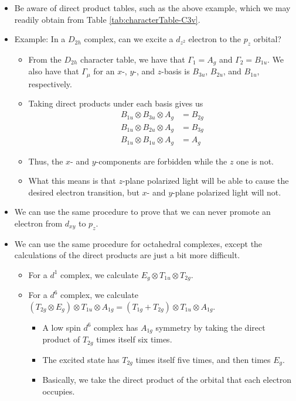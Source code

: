 \documentclass[../notes.tex]{subfiles}
\begin{document}
\begin{itemize}
    \item Be aware of direct product tables, such as the above example, which we may readily obtain from Table \ref{tab:characterTable-C3v}.
    \item Example: In a $D_{2h}$ complex, can we excite a $d_{z^2}$ electron to the $p_z$ orbital?
    \begin{itemize}
        \item From the $D_{2h}$ character table, we have that $\Gamma_1=A_g$ and $\Gamma_2=B_{1u}$. We also have that $\Gamma_\mu$ for an $x$-, $y$-, and $z$-basis is $B_{3u}$, $B_{2u}$, and $B_{1u}$, respectively.
        \item Taking direct products under each basis gives us
        \begin{align*}
            B_{1u}\otimes B_{3u}\otimes A_g &= B_{2g}\tag{$x$-basis}\\
            B_{1u}\otimes B_{2u}\otimes A_g &= B_{3g}\tag{$y$-basis}\\
            B_{1u}\otimes B_{1u}\otimes A_g &= A_g\tag{$z$-basis}
        \end{align*}
        \item Thus, the $x$- and $y$-components are forbidden while the $z$ one is not.
        \item What this means is that $z$-plane polarized light will be able to cause the desired electron transition, but $x$- and $y$-plane polarized light will not.
    \end{itemize}
    \item We can use the same procedure to prove that we can never promote an electron from $d_{xy}$ to $p_z$.
    \item We can use the same procedure for octahedral complexes, except the calculations of the direct products are just a bit more difficult.
    \begin{itemize}
        \item For a $d^1$ complex, we calculate $E_g\otimes T_{1u}\otimes T_{2g}$.
        \item For a $d^6$ complex, we calculate $(T_{2g}\otimes E_g)\otimes T_{1u}\otimes A_{1g}=(T_{1g}+T_{2g})\otimes T_{1u}\otimes A_{1g}$.
        \begin{itemize}
            \item A low spin $d^6$ complex has $A_{1g}$ symmetry by taking the direct product of $T_{2g}$ times itself six times.
            \item The excited state has $T_{2g}$ times itself five times, and then times $E_g$.
            \item Basically, we take the direct product of the orbital that each electron occupies.
        \end{itemize}
    \end{itemize}
\end{itemize}
\end{document}
